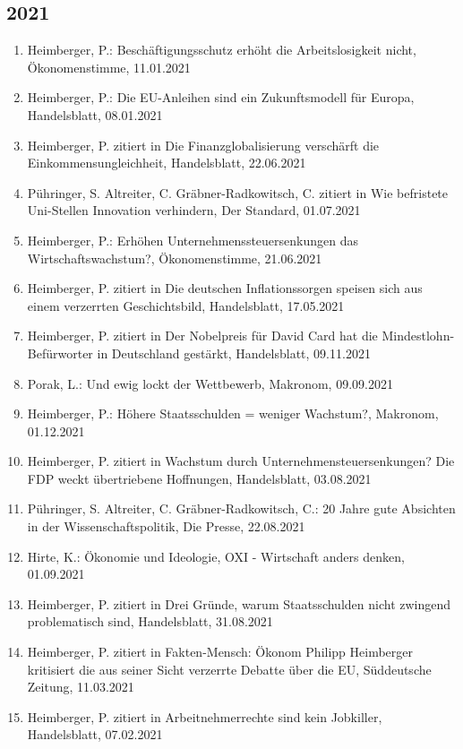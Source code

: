\subsection*{2021}
\begin{enumerate}
	 \item Heimberger, P.: Beschäftigungsschutz erhöht die Arbeitslosigkeit nicht, Ökonomenstimme, 11.01.2021
	 \item Heimberger, P.: Die EU-Anleihen sind ein Zukunftsmodell für Europa, Handelsblatt, 08.01.2021
	 \item Heimberger, P. zitiert in Die Finanzglobalisierung verschärft die Einkommensungleichheit, Handelsblatt, 22.06.2021
	 \item Pühringer, S. Altreiter, C. Gräbner-Radkowitsch, C. zitiert in Wie befristete Uni-Stellen Innovation verhindern, Der Standard, 01.07.2021
	 \item Heimberger, P.: Erhöhen Unternehmenssteuersenkungen das Wirtschaftswachstum?, Ökonomenstimme, 21.06.2021
	 \item Heimberger, P. zitiert in Die deutschen Inflationssorgen speisen sich aus einem verzerrten Geschichtsbild, Handelsblatt, 17.05.2021
	 \item Heimberger, P. zitiert in Der Nobelpreis für David Card hat die Mindestlohn-Befürworter in Deutschland gestärkt, Handelsblatt, 09.11.2021
	 \item Porak, L.: Und ewig lockt der Wettbewerb, Makronom, 09.09.2021
	 \item Heimberger, P.: Höhere Staatsschulden = weniger Wachstum?, Makronom, 01.12.2021
	 \item Heimberger, P. zitiert in Wachstum durch Unternehmensteuersenkungen? Die FDP weckt übertriebene Hoffnungen, Handelsblatt, 03.08.2021
	 \item Pühringer, S. Altreiter, C. Gräbner-Radkowitsch, C.: 20 Jahre gute Absichten in der Wissenschaftspolitik, Die Presse, 22.08.2021
	 \item Hirte, K.: Ökonomie und Ideologie, OXI - Wirtschaft anders denken, 01.09.2021
	 \item Heimberger, P. zitiert in Drei Gründe, warum Staatsschulden nicht zwingend problematisch sind, Handelsblatt, 31.08.2021
	 \item Heimberger, P. zitiert in Fakten-Mensch: Ökonom Philipp Heimberger kritisiert die aus seiner Sicht verzerrte Debatte über die EU, Süddeutsche Zeitung, 11.03.2021
	 \item Heimberger, P. zitiert in Arbeitnehmerrechte sind kein Jobkiller, Handelsblatt, 07.02.2021

\end{enumerate}
